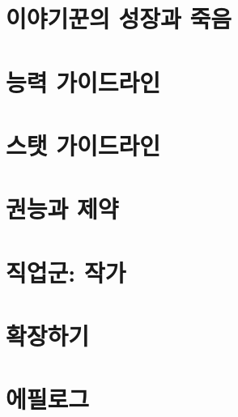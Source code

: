 \documentclass{report}
\begin{document}
	\chapter{이야기꾼의 성장과 죽음}
		
	
	\hypertarget{ability-guidelines}{}
	\chapter{능력 가이드라인}
		
	
	\chapter{스탯 가이드라인}
		
	
	\hypertarget{power-limit}{}
	\chapter{권능과 제약}
		
	
	\hypertarget{author}{}
	\chapter{직업군: 작가}
		
	
	\hypertarget{expand}{}
	\chapter{확장하기}
		
	
	\chapter{에필로그}
		
\end{document}
